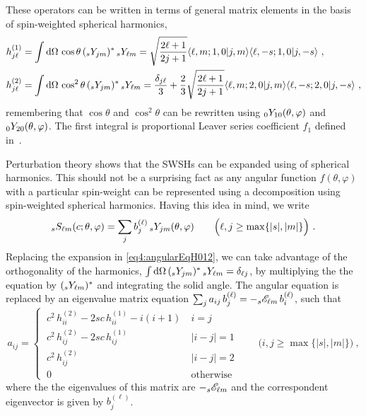 These operators can be written in terms of general matrix elements in the basis of spin-weighted spherical harmonics,
\begin{align}
	\begin{split}
	h^{(1)}_{j\ell} &= \int \dd\Omega \,\cos\theta \,(\uu[s]{Y}{j m})^* \,\uu[s]{Y}{\ell m} = \sqrt{\frac{2 \ell+1}{2 j+1}} \langle \ell,m; 1,0 | j,m \rangle \langle \ell, -s; 1,0 | j, -s \rangle ~, \\
	h^{(2)}_{j\ell} &= \int \dd\Omega \,\cos^2\theta \,(\uu[s]{Y}{j m})^* \,\uu[s]{Y}{\ell m} = \frac{\delta_{j\ell}}{3} + \frac{2}{3}\sqrt{\frac{2 \ell+1}{2 j+1}} \langle \ell,m; 2,0 | j,m \rangle \langle \ell, -s; 2,0 | j, -s \rangle ~,
	\end{split}
\end{align}
remembering that $\cos\theta$ and $\cos^2\theta$ can be rewritten using $\uu[0]{Y}{10}(\theta,\varphi)$ and $\uu[0]{Y}{20}(\theta,\varphi)$.
The first integral is proportional Leaver series coefficient $f_1$ defined in~.

Perturbation theory shows that the SWSHs can be expanded using of spherical harmonics.
This should not be a surprising fact as any angular function $f(\theta,\varphi)$ with a particular spin-weight can be represented using a decomposition using spin-weighted spherical harmonics.
Having this idea in mind, we write 
\begin{align}
	\label{eq4:SWSHsphericalExpansion}
	\uu[s]{S}{\ell m}(c; \theta, \varphi) = \sum_{j} b_{j}^{(\ell)} \,\uu[s]{Y}{j m}(\theta,\varphi) \qquad \Big( \ell, j \ge \max\{|s|,|m|\} \Big) ~.
\end{align}
Replacing the expansion in \eqref{eq4:angularEqH012}, we can take advantage of the orthogonality of the harmonics, $\int \dd\Omega \,(\uu[s]{Y}{j m})^* \,\uu[s]{Y}{\ell m} = \delta_{\ell j}$, by multiplying the the equation by $(\uu[s]{Y}{\ell m})^*$ and integrating the solid angle.
The angular equation is replaced by an eigenvalue matrix equation $\sum_{j} a_{ij} \, b_{j}^{(\ell)} = - \uu[s]{\mathscr{E}}{\ell m} \,b_{i}^{(\ell)}$, such that
\begin{equation}
	\label{eq4:spectralMatrix}
	a_{ij} =
	\begin{cases} 
		~c^2 \,h^{(2)}_{ii} - 2 s c \,h^{(1)}_{ii} - i(i+1) & ~ i=j \\[-0.5ex]
		~c^2 \,h^{(2)}_{ij} - 2 s c \,h^{(1)}_{ij} & ~ |i-j|=1 \\[-0.5ex]
		~c^2 \,h^{(2)}_{ij} & ~ |i-j|=2 \\[-0.5ex]
		~0 & ~\text{otherwise}
	\end{cases}  \qquad \Big( i, j \ge \max\{|s|,|m|\} \Big) ~,
\end{equation}
where the the eigenvalues of this matrix are $-\uu[s]{\mathscr{E}}{\ell m}$ and the correspondent eigenvector is given by $b_j^{(\ell)}$.


